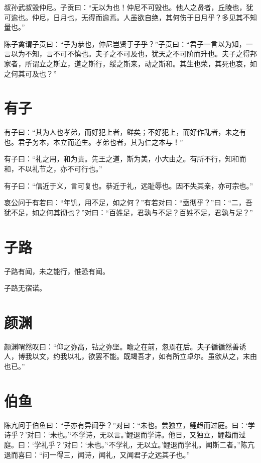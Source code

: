 \documentclass[a5paper]{ctexbook}
\begin{document}
    叔孙武叔毁仲尼。子贡曰：“无以为也！仲尼不可毁也。他人之贤者，丘陵也，犹可逾也。仲尼，日月也，无得而逾焉。人虽欲自绝，其何伤于日月乎？多见其不知量也。”

    陈子禽谓子贡曰：“子为恭也，仲尼岂贤于子乎？”子贡曰：“君子一言以为知，一言以为不知，言不可不慎也。夫子之不可及也，犹天之不可阶而升也。夫子之得邦家者，所谓立之斯立，道之斯行，绥之斯来，动之斯和。其生也荣，其死也哀，如之何其可及也？”

    \chapter{有子}

    有子曰：“其为人也孝弟，而好犯上者，鲜矣；不好犯上，而好作乱者，未之有也。君子务本，本立而道生。孝弟也者，其为仁之本与！”

    有子曰：“礼之用，和为贵。先王之道，斯为美，小大由之。有所不行，知和而和，不以礼节之，亦不可行也。”

    有子曰：“信近于义，言可复也。恭近于礼，远耻辱也。因不失其亲，亦可宗也。”

    哀公问于有若曰：“年饥，用不足，如之何？”有若对曰：“盍彻乎？”曰：“二，吾犹不足，如之何其彻也？”对曰：“百姓足，君孰与不足？百姓不足，君孰与足？”

    \chapter{子路}

    子路有闻，未之能行，惟恐有闻。

    子路无宿诺。

    \chapter{颜渊}

    颜渊喟然叹曰：“仰之弥高，钻之弥坚。瞻之在前，忽焉在后。夫子循循然善诱人，博我以文，约我以礼，欲罢不能。既竭吾才，如有所立卓尔。虽欲从之，末由也已。”

    \chapter{伯鱼}

    陈亢问于伯鱼曰：“子亦有异闻乎？”对曰：“未也。尝独立，鲤趋而过庭。曰：‘学诗乎？’对曰：‘未也。’‘不学诗，无以言。’鲤退而学诗。他日，又独立，鲤趋而过庭。曰：‘学礼乎？’对曰：‘未也。’‘不学礼，无以立。’鲤退而学礼。闻斯二者。”陈亢退而喜曰：“问一得三，闻诗，闻礼，又闻君子之远其子也。”
\end{document}
